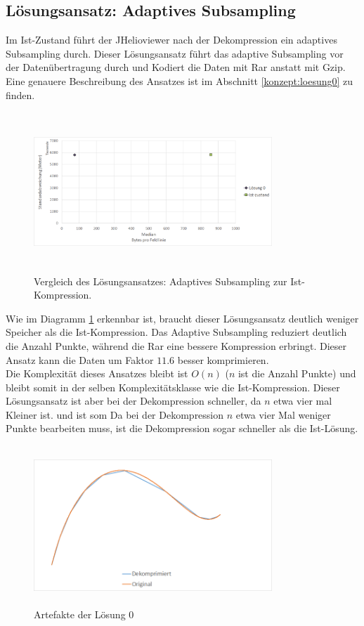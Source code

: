 \subsection{Lösungsansatz: Adaptives Subsampling} \label{resultate:loesung0}
Im Ist-Zustand führt der JHelioviewer nach der Dekompression ein adaptives Subsampling durch. Dieser Lösungsansatz führt das adaptive Subsampling vor der Datenübertragung durch und Kodiert die Daten mit Rar anstatt mit Gzip. Eine genauere Beschreibung des Ansatzes ist im Abschnitt \ref{konzept:loesung0} zu finden.
\begin{figure}[!htbp]
	\center
	\includegraphics[width=0.8\textwidth,height=6cm,keepaspectratio]{./pictures/resultate/loesung0/loesung0_0.png}
	\caption{Vergleich des Lösungsansatzes: Adaptives Subsampling zur Ist-Kompression.}
	\label{resultate:loesung0:loesung0_0}
\end{figure}
Wie im Diagramm \ref{resultate:loesung0:loesung0_0} erkennbar ist, braucht dieser Lösungsansatz deutlich weniger Speicher als die Ist-Kompression. Das Adaptive Subsampling reduziert deutlich die Anzahl Punkte, während die Rar eine bessere Kompression erbringt. Dieser Ansatz kann die Daten um Faktor $11.6$ besser komprimieren.\\
Die Komplexität dieses Ansatzes bleibt ist $O(n)$ ($n$ ist die Anzahl Punkte) und bleibt somit in der selben Komplexitätsklasse wie die Ist-Kompression. Dieser Lösungsansatz ist aber bei der Dekompression schneller, da $n$ etwa vier mal Kleiner ist. und ist som  Da bei der Dekompression $n$ etwa vier Mal weniger Punkte bearbeiten muss, ist die Dekompression sogar schneller als die Ist-Lösung.\\
\begin{figure}[!htbp]
	\center
	\includegraphics[width=0.8\textwidth,height=6cm,keepaspectratio]{./pictures/resultate/loesung0/loesung0_artefakte.png}
	\caption{Artefakte der Lösung 0}
	\label{resultate:loesung0:artefakte}
\end{figure}
